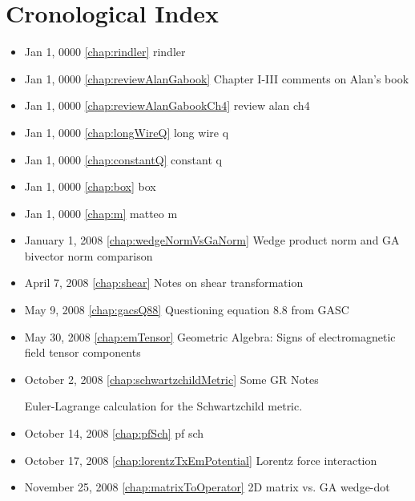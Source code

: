 \chapter{Cronological Index}
\label{chap:Cronology}

\begin{itemize}

\item Jan 1, 0000 \ref{chap:rindler} rindler

\item Jan 1, 0000 \ref{chap:reviewAlanGabook} Chapter I-III comments on Alan's book

\item Jan 1, 0000 \ref{chap:reviewAlanGabookCh4} review alan ch4

\item Jan 1, 0000 \ref{chap:longWireQ} long wire q

\item Jan 1, 0000 \ref{chap:constantQ} constant q

\item Jan 1, 0000 \ref{chap:box} box

\item Jan 1, 0000 \ref{chap:m} matteo m

\item January 1, 2008 \ref{chap:wedgeNormVsGaNorm} Wedge product norm and GA bivector norm comparison

\item April 7, 2008 \ref{chap:shear} Notes on shear transformation

\item May 9, 2008 \ref{chap:gacsQ88} Questioning equation 8.8 from GASC

\item May 30, 2008 \ref{chap:emTensor} Geometric Algebra: Signs of electromagnetic field tensor components

\item October 2, 2008 \ref{chap:schwartzchildMetric} Some GR Notes

Euler-Lagrange calculation for the Schwartzchild metric.\item October 14, 2008 \ref{chap:pfSch} pf sch

\item October 17, 2008 \ref{chap:lorentzTxEmPotential} Lorentz force interaction

\item November 25, 2008 \ref{chap:matrixToOperator} 2D matrix vs. GA wedge-dot


\end{itemize}
